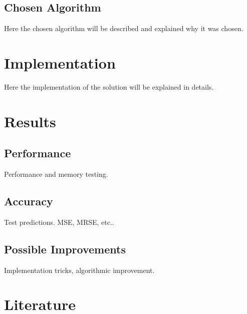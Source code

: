 \documentclass[
  twoside,
  11pt, a4paper,
  footinclude=true,
  headinclude=true,
  cleardoublepage=empty
]{scrreprt}
\begin{document}
        \section{Chosen Algorithm}
            Here the chosen algorithm will be described and explained why it was chosen.
         
    \chapter{Implementation}
        Here the implementation of the solution will be explained in details.
        
    \chapter{Results}
        \section{Performance}
            Performance and memory testing.
        \section{Accuracy}
            Test predictions. MSE, MRSE, etc..
        \section{Possible Improvements}
            Implementation tricks, algorithmic improvement.  

    \chapter{Literature}
        
        
        
\end{document}

